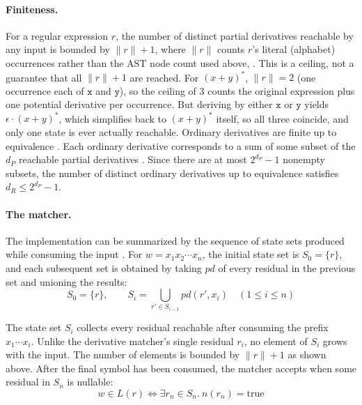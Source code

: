 %

\paragraph{Finiteness.}
For a regular expression $r$, 
the number of distinct partial derivatives reachable by any input 
is bounded by $\|r\|+1$, where $\|r\|$ counts $r$'s literal (alphabet) 
occurrences rather than the AST node count used above, 
\citep[Theorem~3.4, p.~309]{antimirov1996}. 
This is a ceiling, not a guarantee that all $\|r\|+1$ are reached.
For $(x{+}y)^{*}$, $\|r\| = 2$ (one occurrence each of $\mathtt{x}$ and
$\mathtt{y}$), so the ceiling of $3$ counts the original expression plus
one potential derivative per occurrence. But deriving by either
$\mathtt{x}$ or $\mathtt{y}$ yields $\epsilon\cdot(x{+}y)^{*}$, which
simplifies back to $(x{+}y)^{*}$ itself, so all three coincide, 
and only one state is ever actually reachable.
Ordinary derivatives are finite up to equivalence
\citep[Theorem~5.2]{brzozowski1964}.
Each ordinary derivative corresponds to a sum
of some subset of the $d_P$ reachable partial
derivatives \citep[Corollary~2.11, p.~306]{antimirov1996}. 
Since there are at most
$2^{d_P}-1$ nonempty subsets, the number
of distinct ordinary derivatives up to
equivalence satisfies $d_R \leq 2^{d_P}-1$.

%

\paragraph{The matcher.}
The implementation can be summarized by the sequence of state sets
produced while consuming the input \citep[p.6]{sulzmann_slides}. 
For $w=x_1x_2\cdots x_n$, the initial state set is $S_0=\{r\}$, 
and each subsequent set is obtained by taking $pd$ of every residual
in the previous set and unioning the results:
\begin{equation}
S_0=\{r\},
\qquad
S_i=\bigcup_{r'\in S_{i-1}} pd(r',x_i)
\quad (1\leq i\leq n)
\label{eq:pderiv-state-set}
\end{equation}

The state set $S_i$ collects every residual reachable 
after consuming the prefix $x_1\cdots x_i$. 
Unlike the derivative matcher's single residual $r_i$, 
no element of $S_i$ grows with the input. 
The number of elements is bounded by $\|r\|+1$ as shown above. 
After the final symbol has been consumed, 
the matcher accepts when some residual in $S_n$ is nullable:
\[
w\in L(r)
\iff
\exists r_n \in S_n.\ n(r_n)=\mathrm{true}
\]

